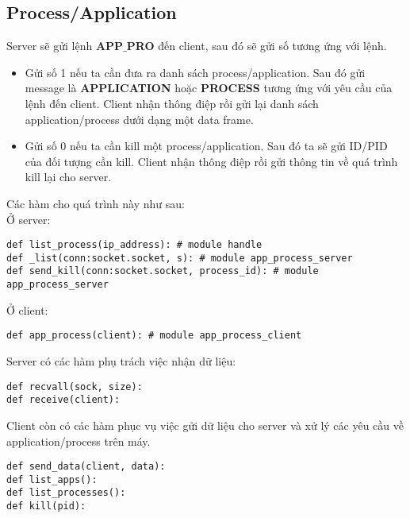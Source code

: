 \subsection{Process/Application}
Server sẽ gửi lệnh \textbf{APP$\_$PRO} đến client, sau đó sẽ gửi số tương ứng với lệnh.
\begin{itemize}
\item Gửi số 1 nếu ta cần đưa ra danh sách process/application. Sau đó gửi message là \textbf{APPLICATION} hoặc \textbf{PROCESS} tương ứng với yêu cầu của lệnh đến client. Client nhận thông điệp rồi gửi lại danh sách application/process dưới dạng một data frame.
\item Gửi số 0 nếu ta cần kill một process/application. Sau đó ta sẽ gửi ID/PID của đối tượng cần kill. Client nhận thông điệp rồi gửi thông tin về quá trình kill lại cho server.
\end{itemize}
Các hàm cho quá trình này như sau:\\
Ở server:
\begin{lstlisting}
def list_process(ip_address): # module handle
def _list(conn:socket.socket, s): # module app_process_server
def send_kill(conn:socket.socket, process_id): # module app_process_server
\end{lstlisting}
Ở client:
\begin{lstlisting}
def app_process(client): # module app_process_client
\end{lstlisting}
Server có các hàm phụ trách việc nhận dữ liệu:
\begin{lstlisting}
def recvall(sock, size):
def receive(client):
\end{lstlisting}
Client còn có các hàm phục vụ việc gửi dữ liệu cho server và xử lý các yêu cầu về application/process trên máy.
\begin{lstlisting}
def send_data(client, data):
def list_apps():
def list_processes():
def kill(pid):
\end{lstlisting}
